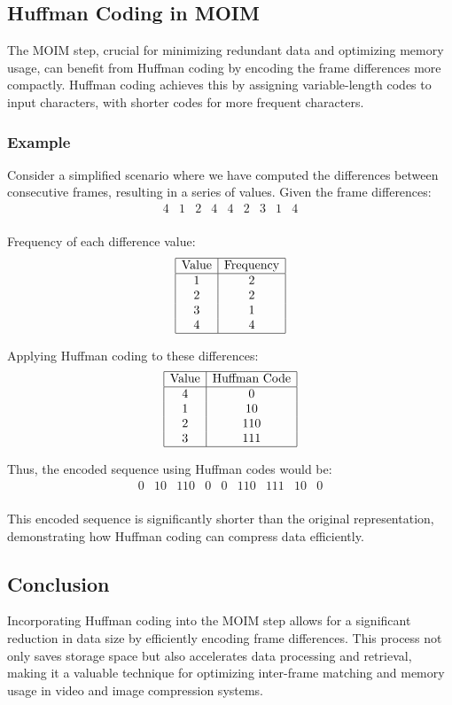 \documentclass[twocolumn]{article}
\begin{document}
\subsection{Huffman Coding in MOIM}
The MOIM step, crucial for minimizing redundant data and optimizing memory usage, can benefit from Huffman coding by encoding the frame differences more compactly. Huffman coding achieves this by assigning variable-length codes to input characters, with shorter codes for more frequent characters. 

\subsubsection{Example}
Consider a simplified scenario where we have computed the differences between consecutive frames, resulting in a series of values. Given the frame differences:
\[
\begin{array}{ccccccccc}
4 & 1 & 2 & 4 & 4 & 2 & 3 & 1 & 4 \\
\end{array}
\]

Frequency of each difference value:
\[
\begin{array}{|c|c|}
\hline
\text{Value} & \text{Frequency} \\
\hline
1 & 2 \\
2 & 2 \\
3 & 1 \\
4 & 4 \\
\hline
\end{array}
\]

Applying Huffman coding to these differences:
\[
\begin{array}{|c|c|}
\hline
\text{Value} & \text{Huffman Code} \\
\hline
4 & 0 \\
1 & 10 \\
2 & 110 \\
3 & 111 \\
\hline
\end{array}
\]

Thus, the encoded sequence using Huffman codes would be:
\[
\begin{array}{ccccccccc}
0 & 10 & 110 & 0 & 0 & 110 & 111 & 10 & 0 \\
\end{array}
\]

This encoded sequence is significantly shorter than the original representation, demonstrating how Huffman coding can compress data efficiently.

\subsection{Conclusion}
Incorporating Huffman coding into the MOIM step allows for a significant reduction in data size by efficiently encoding frame differences. This process not only saves storage space but also accelerates data processing and retrieval, making it a valuable technique for optimizing inter-frame matching and memory usage in video and image compression systems.
\end{document}
